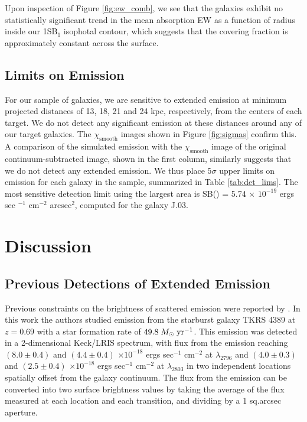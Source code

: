 \documentclass[twocolumn]{aastex61}
\def \msunperyr {{\; M_{\odot}\rm \;yr^{-1}}}
\begin{document}
Upon inspection of Figure \ref{fig:ew_comb}, we see that the galaxies exhibit no statistically significant trend in the mean absorption EW as a function of radius inside our 1SB$_1$ isophotal contour, which suggests that the covering fraction is approximately constant across the surface.

\subsection{Limits on  Emission}
For our sample of galaxies, we are sensitive to extended emission at minimum projected distances of 
13, 18, 21 and 24 kpc, respectively, from the centers of each target.
We do not detect any significant  emission at these distances around any of our target galaxies. The $\chi_{\text{smooth}}$ images shown in Figure \ref{fig:sigmas} confirm this. A comparison of the simulated emission with the $\chi_{\text{smooth}}$ image of the original continuum-subtracted image, shown in the first column, similarly suggests that we do not detect any extended  emission. We thus place $5\sigma$ upper limits on  emission for each galaxy in the sample, summarized in Table \ref{tab:det_lims}. The most sensitive detection limit using the largest area is SB() = 5.74 $\times$ $10^{-19}$ ergs sec $^{-1}$ cm$^{-2}$ arcsec$^2$, computed for the galaxy J.03. 
\section{Discussion}\label{sec:discussion}

\subsection{Previous Detections of Extended  Emission}
Previous constraints on the brightness of scattered  emission were reported by \cite{Rubin_2011}. In this work the authors studied emission from the starburst galaxy TKRS 4389 at $z = 0.69$ with a star formation rate of $49.8\msunperyr$. This emission was detected in a 2-dimensional Keck/LRIS spectrum, with flux from the emission reaching $(8.0 \pm 0.4)$ and $(4.4 \pm 0.4)$ $\times10^{-18}$ ergs sec$^{-1}$ cm$^{-2}$ at  $\lambda _{2796}$ and $(4.0 \pm 0.3)$ and $(2.5 \pm 0.4)$ $\times10^{-18}$ ergs sec$^{-1}$ cm$^{-2}$ at $\lambda_{2803}$ in two independent locations spatially offset from the galaxy continuum. The flux from the emission can be converted into two surface brightness values by taking the average of the flux measured at each location and each transition, and dividing by a 1 sq.arcsec aperture. 
\end{document}
